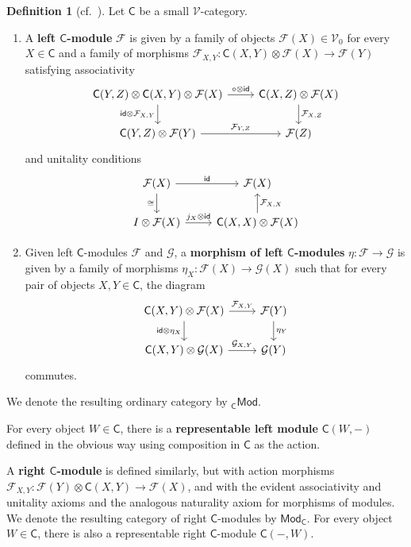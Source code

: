 \documentclass[11pt,onecolumn]{article}
\newcommand{\id}{\mathsf{id}}
\newcommand{\cV}{\mathscr{V}}
\newcommand{\cC}{\mathsf{C}}
\newcommand{\Mod}{\mathsf{Mod}}
\theoremstyle{plain}
\theoremstyle{remark}
\theoremstyle{definition}
\newtheorem{definition}[definition]{Definition}
\begin{document}
\begin{definition}[{cf.~\cite[Section~3]{StreetEnrichedCohomology}}]
	\label{def:module}
	Let $\cC$ be a small $\cV$-category.
	\begin{enumerate}
		\item A \textbf{left $\cC$-module} $\mathcal{F}$ is given by a family of objects $\mathcal{F}(X) \in \cV_0$ for every $X \in \cC$ and a family of morphisms $\mathcal{F}_{X, Y} : \cC(X, Y) \otimes \mathcal{F}(X) \longrightarrow \mathcal{F}(Y)$
			satisfying associativity 
			\[
				\begin{tikzcd}
					\cC(Y, Z) \otimes \cC(X, Y) \otimes \mathcal{F}(X) \ar[r, "\circ \otimes \id"] \ar[d, "\id \otimes \mathcal{F}_{X, Y}"'] & \cC(X, Z) \otimes \mathcal{F}(X) \ar[d, "\mathcal{F}_{X, Z}"] \\
					\cC(Y, Z) \otimes \mathcal{F}(Y) \ar[r, "\mathcal{F}_{Y, Z}"] & \mathcal{F}(Z)
				\end{tikzcd}
			\]
			and unitality conditions
			\[
				\begin{tikzcd}
					\mathcal{F}(X) \ar[r, "\id"] \ar[d, "\cong"'] & \mathcal{F}(X) \\
					I \otimes \mathcal{F}(X) \ar[r, "j_X \otimes \id"] & \cC(X, X) \otimes \mathcal{F}(X) \ar[u, "\mathcal{F}_{X, X}"']
				\end{tikzcd}
			\]
		\item Given left $\cC$-modules $\mathcal{F}$ and $\mathcal{G}$, a \textbf{morphism of left $\cC$-modules} $\eta : \mathcal{F} \to \mathcal{G}$ is given by a family of morphisms $\eta_X : \mathcal{F}(X) \to \mathcal{G}(X)$ such that for every pair of objects $X, Y \in \cC$, the diagram
			\[
				\begin{tikzcd}
					\cC(X, Y) \otimes \mathcal{F}(X) \ar[r, "\mathcal{F}_{X, Y}"] \ar[d, "\id \otimes \eta_X"'] & \mathcal{F}(Y) \ar[d, "\eta_Y"] \\
					\cC(X, Y) \otimes \mathcal{G}(X) \ar[r, "\mathcal{G}_{X, Y}"] & \mathcal{G}(Y)
				\end{tikzcd}
			\]
			commutes.
	\end{enumerate}
	We denote the resulting ordinary category by ${}_\cC\Mod$.
\end{definition}

For every object $W \in \cC$, there is a \textbf{representable left module} $\cC(W, -)$ defined in the obvious way using composition in $\cC$ as the action.

A \textbf{right $\cC$-module} is defined similarly, but with action morphisms $\mathcal{F}_{X, Y} : \mathcal{F}(Y) \otimes \cC(X, Y) \longrightarrow \mathcal{F}(X)$,
and with the evident associativity and unitality axioms and the analogous naturality axiom for morphisms of modules.
We denote the resulting category of right $\cC$-modules by $\Mod_\cC$.
For every object $W \in \cC$, there is also a representable right $\cC$-module $\cC(-, W)$.
\end{document}
